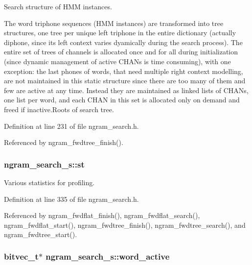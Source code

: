 Search structure of H\-M\-M instances. 

The word triphone sequences (H\-M\-M instances) are transformed into tree structures, one tree per unique left triphone in the entire dictionary (actually diphone, since its left context varies dyamically during the search process). The entire set of trees of channels is allocated once and for all during initialization (since dynamic management of active C\-H\-A\-Ns is time consuming), with one exception\-: the last phones of words, that need multiple right context modelling, are not maintained in this static structure since there are too many of them and few are active at any time. Instead they are maintained as linked lists of C\-H\-A\-Ns, one list per word, and each C\-H\-A\-N in this set is allocated only on demand and freed if inactive.\-Roots of search tree. 

Definition at line 231 of file ngram\-\_\-search.\-h.



Referenced by ngram\-\_\-fwdtree\-\_\-finish().

\subsubsection[{st}]{ ngram\-\_\-search\-\_\-s\-::st}\label{structngram__search__s_a5758d167fbb48e824a6a58186620e06d}


Various statistics for profiling. 



Definition at line 335 of file ngram\-\_\-search.\-h.



Referenced by ngram\-\_\-fwdflat\-\_\-finish(), ngram\-\_\-fwdflat\-\_\-search(), ngram\-\_\-fwdflat\-\_\-start(), ngram\-\_\-fwdtree\-\_\-finish(), ngram\-\_\-fwdtree\-\_\-search(), and ngram\-\_\-fwdtree\-\_\-start().

\subsubsection[{word\-\_\-active}]{\setlength{\rightskip}{0pt plus 5cm}bitvec\-\_\-t$\ast$ ngram\-\_\-search\-\_\-s\-::word\-\_\-active}\label{structngram__search__s_aeb4c98851bf9b239ca607ca59f59ff4c}


